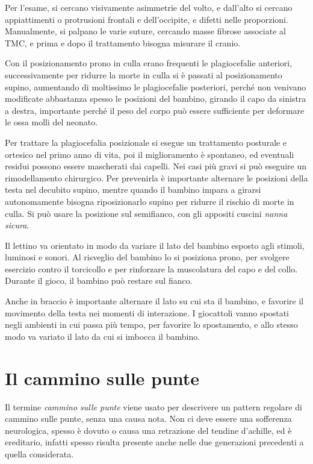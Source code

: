 Per l'esame, si cercano visivamente asimmetrie del volto, e dall'alto si cercano appiattimenti o protrusioni frontali e dell'occipite, e
difetti nelle proporzioni.
Manualmente, si palpano le varie suture, cercando masse fibrose associate al TMC, e prima e dopo il trattamento bisogna misurare il
cranio.

Con il posizionamento prono in culla erano frequenti le plagiocefalie anteriori, successivamente per ridurre la morte in culla si è
passati al posizionamento supino, aumentando di moltissimo le plagiocefalie posteriori, perché non venivano modificate abbastanza spesso
le posizioni del bambino, girando il capo da sinistra a destra, importante perché il peso del corpo può essere sufficiente per deformare
le ossa molli del neonato.

Per trattare la plagiocefalia posizionale si esegue un trattamento posturale e ortesico nel primo anno di vita, poi il miglioramento è
spontaneo, ed eventuali residui possono essere mascherati dai capelli. Nei casi più gravi si può eseguire un rimodellamento chirurgico.
Per prevenirla è importante alternare le posizioni della testa nel decubito supino, mentre quando il bambino impara a girarsi
autonomamente bisogna riposizionarlo supino per ridurre il rischio di morte in culla. Si può usare la posizione sul semifianco, con gli
appositi cuscini \textit{nanna sicura}.

Il lettino va orientato in modo da variare il lato del bambino esposto agli stimoli, luminosi e sonori. Al risveglio del bambino lo si
posiziona prono, per svolgere esercizio contro il torcicollo e per rinforzare la muscolatura del capo e del collo. Durante il gioco, il
bambino può restare sul fianco.

Anche in braccio è importante alternare il lato su cui sta il bambino, e favorire il movimento della testa nei momenti di interazione. I
giocattoli vanno spostati negli ambienti in cui passa più tempo, per favorire lo spostamento, e allo stesso modo va variato il lato da
cui si imbocca il bambino.

\chapter{Il cammino sulle punte}
Il termine \textit{cammino sulle punte} viene usato per descrivere un pattern regolare di cammino sulle punte, senza una causa nota.
Non ci deve essere una sofferenza neurologica, spesso è dovuto o causa una retrazione del tendine d'achille, ed è ereditario, infatti
spesso risulta presente anche nelle due generazioni precedenti a quella considerata.

